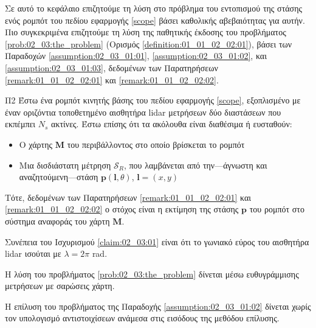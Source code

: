Σε αυτό το κεφάλαιο επιζητούμε τη λύση στο πρόβλημα του εντοπισμού της στάσης
ενός ρομπότ του πεδίου εφαρμογής \ref{scope} βάσει καθολικής αβεβαιότητας για
αυτήν. Πιο συγκεκριμένα επιζητούμε τη λύση της παθητικής έκδοσης του προβλήματος
\ref{prob:02_03:the_problem} (Ορισμός \ref{definition:01_01_02_02:01}), βάσει
των Παραδοχών \ref{assumption:02_03_01:01}, \ref{assumption:02_03_01:02}, και
\ref{assumption:02_03_01:03}, δεδομένων των Παρατηρήσεων
\ref{remark:01_01_02_02:01} και \ref{remark:01_01_02_02:02}.

\begin{bw_box}
\begin{customproblem}{Π2}
  \label{prob:02_03:the_problem}
  Έστω ένα ρομπότ κινητής βάσης του πεδίου εφαρμογής \ref{scope}, εξοπλισμένο με
  έναν οριζόντια τοποθετημένο αισθητήρα lidar μετρήσεων δύο διαστάσεων που
  εκπέμπει $N_s$ ακτίνες. Έστω επίσης ότι τα ακόλουθα είναι διαθέσιμα ή
  ευσταθούν:
  \begin{itemize}
    \item Ο χάρτης $\bm{M}$ του περιβάλλοντος στο οποίο βρίσκεται το ρομπότ
    \item Μια δισδιάστατη μέτρηση $\mathcal{S}_R$, που λαμβάνεται από
          την---άγνωστη και αναζητούμενη---στάση $\bm{p}(\bm{l},\theta)$,
          $\bm{l} = (x,y)$
  \end{itemize}
\end{customproblem}
Τότε, δεδομένων των Παρατηρήσεων \ref{remark:01_01_02_02:01} και
\ref{remark:01_01_02_02:02} ο στόχος είναι η εκτίμηση της στάσης $\bm{p}$ του
ρομπότ στο σύστημα αναφοράς του χάρτη $\bm{M}$.
\end{bw_box}

\begin{bw_box}
  \begin{assumption}
    \label{assumption:02_03_01:01}
    Συνέπεια του Ισχυρισμού \ref{claim:02_03:01} είναι ότι το γωνιακό εύρος του
    αισθητήρα lidar ισούται με $\lambda = 2\pi$ rad.
  \end{assumption}
\end{bw_box}

\begin{bw_box}
  \begin{assumption}
    \label{assumption:02_03_01:02}
    Η λύση του προβλήματος \ref{prob:02_03:the_problem} δίνεται μέσω
    ευθυγράμμισης μετρήσεων με σαρώσεις χάρτη.
  \end{assumption}
\end{bw_box}

\begin{bw_box}
  \begin{assumption}
    \label{assumption:02_03_01:03}
    Η επίλυση του προβλήματος της Παραδοχής \ref{assumption:02_03_01:02}
    δίνεται χωρίς τον υπολογισμό αντιστοιχίσεων ανάμεσα στις εισόδους
    της μεθόδου επίλυσης.
  \end{assumption}
\end{bw_box}


